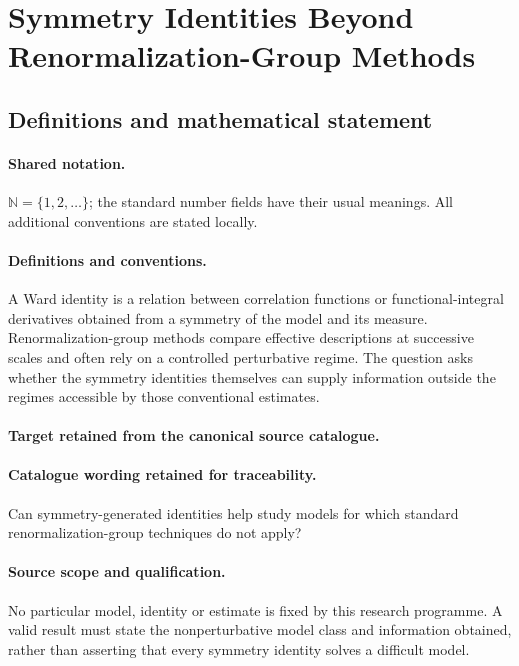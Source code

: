 \documentclass[11pt]{article}
\begin{document}
\section{Symmetry Identities Beyond Renormalization-Group Methods}\label{statement}

\subsection{Definitions and mathematical statement}

\paragraph{Shared notation.}$\mathbb N=\{1,2,\ldots\}$; the standard number fields have their usual meanings. All additional conventions are stated locally.


\paragraph{Definitions and conventions.}
A Ward identity is a relation between correlation functions or functional-integral derivatives obtained from a symmetry of the model and its measure. Renormalization-group methods compare effective descriptions at successive scales and often rely on a controlled perturbative regime. The question asks whether the symmetry identities themselves can supply information outside the regimes accessible by those conventional estimates.

\paragraph{Target retained from the canonical source catalogue.}
\paragraph{Catalogue wording retained for traceability.}
Can symmetry-generated identities help study models for which standard renormalization-group techniques do not apply?

\paragraph{Source scope and qualification.}
No particular model, identity or estimate is fixed by this research programme. A valid result must state the nonperturbative model class and information obtained, rather than asserting that every symmetry identity solves a difficult model.
\end{document}
